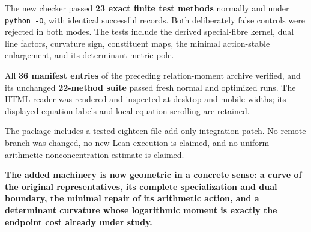 The new checker passed \textbf{23 exact finite test methods} normally and under \texttt{python\ -O}, with identical successful records. Both deliberately false controls were rejected in both modes. The tests include the derived special-fibre kernel, dual line factors, curvature sign, constituent maps, the minimal action-stable enlargement, and its determinant-metric pole.

All \textbf{36 manifest entries} of the preceding relation-moment archive verified, and its unchanged \textbf{22-method suite} passed fresh normal and optimized runs. The HTML reader was rendered and inspected at desktop and mobile widths; its displayed equation labels and local equation scrolling are retained.

The package includes a \href{sources/endpoint_user_sources/HISTORICAL_DOWNLOAD_LINKS.md}{tested eighteen-file add-only integration patch}. No remote branch was changed, no new Lean execution is claimed, and no uniform arithmetic nonconcentration estimate is claimed.

\textbf{The added machinery is now geometric in a concrete sense: a curve of the original representatives, its complete specialization and dual boundary, the minimal repair of its arithmetic action, and a determinant curvature whose logarithmic moment is exactly the endpoint cost already under study.}
